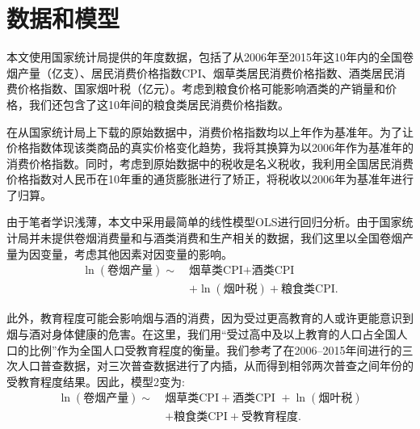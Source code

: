 \documentclass[10pt,a4paper,twocolumn]{PPRAcn} %
\begin{document}
\section{数据和模型}

本文使用国家统计局提供的年度数据，包括了从2006年至2015年这10年内的全国卷烟产量（亿支）、居民消费价格指数CPI、烟草类居民消费价格指数、酒类居民消费价格指数、国家烟叶税（亿元）。考虑到粮食价格可能影响酒类的产销量和价格，我们还包含了这10年间的粮食类居民消费价格指数。

在从国家统计局上下载的原始数据中，消费价格指数均以上年作为基准年。为了让价格指数体现该类商品的真实价格变化趋势，我将其换算为以2006年作为基准年的消费价格指数。同时，考虑到原始数据中的税收是名义税收，我利用全国居民消费价格指数对人民币在10年重的通货膨胀进行了矫正，将税收以2006年为基准年进行了归算。

由于笔者学识浅薄，本文中采用最简单的线性模型OLS进行回归分析。由于国家统计局并未提供卷烟消费量和与酒类消费和生产相关的数据，我们这里以全国卷烟产量为因变量，考虑其他因素对因变量的影响。
\begin{align}\label{eq:without-edu}
	\ln(\text{卷烟产量}) \sim\  &\text{烟草类CPI} + \text{酒类CPI } \nonumber \\ 
	& + \ln(\text{烟叶税}) + \text{粮食类CPI}.
\end{align}
	
此外，教育程度可能会影响烟与酒的消费，因为受过更高教育的人或许更能意识到烟与酒对身体健康的危害。在这里，我们用“受过高中及以上教育的人口占全国人口的比例”作为全国人口受教育程度的衡量。我们参考了在2006--2015年间进行的三次人口普查数据，对三次普查数据进行了内插，从而得到相邻两次普查之间年份的受教育程度结果。因此，模型2变为:
\begin{align}\label{eq:with-edu}
	\ln(\text{卷烟产量}) \sim\  &\text{烟草类CPI} + \text{酒类CPI } + \ln(\text{烟叶税}) \nonumber \\ 
	& + \text{粮食类CPI} +  \text{受教育程度} .
\end{align}
\end{document}
